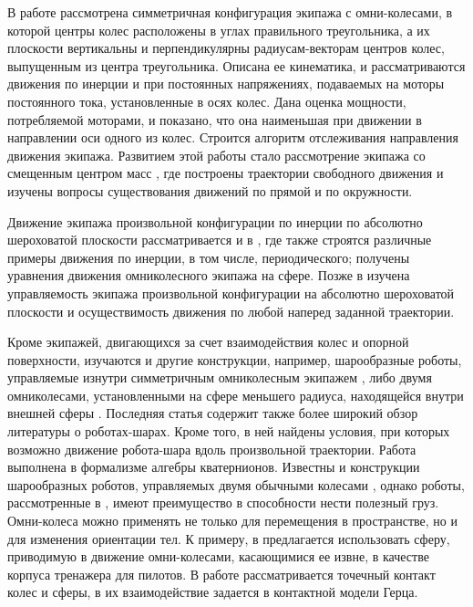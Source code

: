 В работе \cite{formalskii} рассмотрена симметричная конфигурация экипажа с омни-колесами, в которой центры колес расположены в углах правильного треугольника, а их плоскости вертикальны и перпендикулярны радиусам-векторам центров колес, выпущенным из центра треугольника. Описана ее кинематика, и рассматриваются движения по инерции и при постоянных напряжениях, подаваемых на моторы постоянного тока, установленные в осях колес. Дана оценка мощности, потребляемой моторами, и показано, что она наименьшая при движении в направлении оси одного из колес. Строится алгоритм отслеживания направления движения экипажа. Развитием этой работы стало рассмотрение экипажа со смещенным центром масс \cite{Martynenko2010_rus}, где построены траектории свободного движения и изучены вопросы существования движений по прямой и по окружности.

Движение экипажа произвольной конфигурации по инерции по абсолютно шероховатой плоскости рассматривается и в \cite{Borisov2011}, где также строятся различные примеры движения по инерции, в том числе, периодического; получены уравнения движения омниколесного экипажа на сфере. Позже в \cite{KilinBobykin2014} изучена управляемость экипажа произвольной конфигурации на абсолютно шероховатой плоскости и осуществимость движения по любой наперед заданной траектории.

Кроме экипажей, двигающихся за счет взаимодействия колес и опорной поверхности, изучаются и другие конструкции, например, шарообразные роботы, управляемые изнутри симметричным омниколесным экипажем \cite{Karavaev2015},
либо двумя омниколесами,  установленными на сфере меньшего радиуса, находящейся внутри внешней сферы \cite{Ivanov2015a}. Последняя статья содержит также более широкий обзор литературы о роботах-шарах. Кроме того, в ней найдены условия, при которых возможно движение робота-шара вдоль произвольной траектории. Работа выполнена в формализме алгебры кватернионов. Известны и конструкции шарообразных роботов, управляемых двумя обычными колесами \cite{Zhan2011}, однако роботы, рассмотренные в \cite{Ivanov2015a}, имеют преимущество в способности нести полезный груз. Омни-колеса можно применять не только для перемещения в пространстве, но и для изменения ориентации тел. К примеру, в \cite{Weiss2015,Plumpton2014} предлагается использовать сферу, приводимую в движение омни-колесами, касающимися ее извне, в качестве корпуса тренажера для пилотов. В работе \cite{Plumpton2014} рассматривается точечный контакт колес и сферы, в \cite{Weiss2015} их взаимодействие задается в контактной модели Герца.

